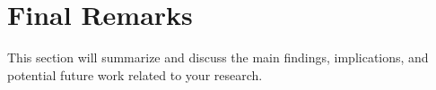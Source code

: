 \documentclass[../thesis.tex]{subfiles}
\begin{document}
	\newpage
	
	\section{Final Remarks}\label{sec:final-remarks}

	This section will summarize and discuss the main findings, implications, and potential future work related to your research.	
\end{document}
